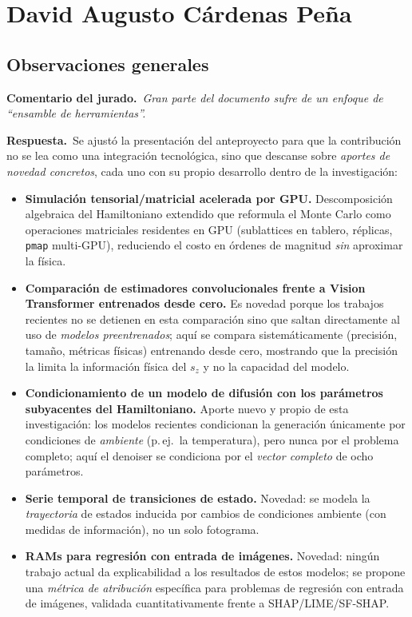 \documentclass[11pt]{article}
\newcommand{\comentario}[1]{\par\smallskip\noindent\textbf{\color{jgris}Comentario del jurado.}\ \textit{#1}\par}
\newcommand{\respuesta}[1]{\par\smallskip\noindent\textbf{\color{jverde}Respuesta.}\ #1\par}
\begin{document}
\section{David Augusto Cárdenas Peña}

\subsection{Observaciones generales}

\comentario{Gran parte del documento sufre de un enfoque de ``ensamble de herramientas''.}
\respuesta{Se ajustó la presentación del anteproyecto para que la contribución no se lea como una integración tecnológica, sino que descanse sobre \emph{aportes de novedad concretos}, cada uno con su propio desarrollo dentro de la investigación:
\begin{itemize}
  \item[(i)] \textbf{Simulación tensorial/matricial acelerada por GPU.} Descomposición algebraica del Hamiltoniano extendido que reformula el Monte Carlo como operaciones matriciales residentes en GPU (sublattices en tablero, réplicas, \texttt{pmap} multi-GPU), reduciendo el costo en órdenes de magnitud \emph{sin} aproximar la física.
  \item[(ii)] \textbf{Comparación de estimadores convolucionales frente a Vision Transformer entrenados desde cero.} Es novedad porque los trabajos recientes no se detienen en esta comparación sino que saltan directamente al uso de \emph{modelos preentrenados}; aquí se compara sistemáticamente (precisión, tamaño, métricas físicas) entrenando desde cero, mostrando que la precisión la limita la información física del $s_z$ y no la capacidad del modelo.
  \item[(iii)] \textbf{Condicionamiento de un modelo de difusión con los parámetros subyacentes del Hamiltoniano.} Aporte nuevo y propio de esta investigación: los modelos recientes condicionan la generación únicamente por condiciones de \emph{ambiente} (p.\,ej.\ la temperatura), pero nunca por el problema completo; aquí el denoiser se condiciona por el \emph{vector completo} de ocho parámetros.
  \item[(iv)] \textbf{Serie temporal de transiciones de estado.} Novedad: se modela la \emph{trayectoria} de estados inducida por cambios de condiciones ambiente (con medidas de información), no un solo fotograma.
  \item[(v)] \textbf{RAMs para regresión con entrada de imágenes.} Novedad: ningún trabajo actual da explicabilidad a los resultados de estos modelos; se propone una \emph{métrica de atribución} específica para problemas de regresión con entrada de imágenes, validada cuantitativamente frente a SHAP/LIME/SF-SHAP.

\end{itemize}}
\end{document}
